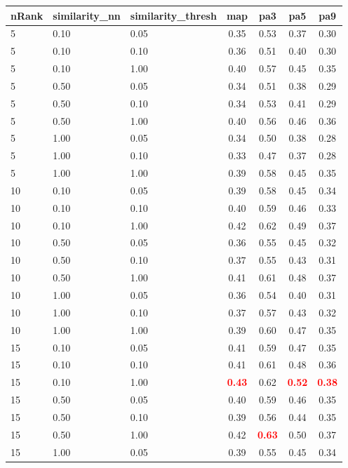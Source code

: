   
\begin{table} 
\begin{center} 
\scriptsize 
 \setlength{\tabcolsep}{.16667em} 
\begin{tabular}{lllcccc} 
nRank & similarity\_nn & similarity\_thresh & map & pa3 & pa5 & pa9 \\ 
\hline 
 5 & 0.10 & 0.05 & 0.35 & 0.53 & 0.37 & 0.30 \\ 
 5 & 0.10 & 0.10 & 0.36 & 0.51 & 0.40 & 0.30 \\ 
 5 & 0.10 & 1.00 & 0.40 & 0.57 & 0.45 & 0.35 \\ 
 5 & 0.50 & 0.05 & 0.34 & 0.51 & 0.38 & 0.29 \\ 
 5 & 0.50 & 0.10 & 0.34 & 0.53 & 0.41 & 0.29 \\ 
 5 & 0.50 & 1.00 & 0.40 & 0.56 & 0.46 & 0.36 \\ 
 5 & 1.00 & 0.05 & 0.34 & 0.50 & 0.38 & 0.28 \\ 
 5 & 1.00 & 0.10 & 0.33 & 0.47 & 0.37 & 0.28 \\ 
 5 & 1.00 & 1.00 & 0.39 & 0.58 & 0.45 & 0.35 \\ 
10 & 0.10 & 0.05 & 0.39 & 0.58 & 0.45 & 0.34 \\ 
10 & 0.10 & 0.10 & 0.40 & 0.59 & 0.46 & 0.33 \\ 
10 & 0.10 & 1.00 & 0.42 & 0.62 & 0.49 & 0.37 \\ 
10 & 0.50 & 0.05 & 0.36 & 0.55 & 0.45 & 0.32 \\ 
10 & 0.50 & 0.10 & 0.37 & 0.55 & 0.43 & 0.31 \\ 
10 & 0.50 & 1.00 & 0.41 & 0.61 & 0.48 & 0.37 \\ 
10 & 1.00 & 0.05 & 0.36 & 0.54 & 0.40 & 0.31 \\ 
10 & 1.00 & 0.10 & 0.37 & 0.57 & 0.43 & 0.32 \\ 
10 & 1.00 & 1.00 & 0.39 & 0.60 & 0.47 & 0.35 \\ 
15 & 0.10 & 0.05 & 0.41 & 0.59 & 0.47 & 0.35 \\ 
15 & 0.10 & 0.10 & 0.41 & 0.61 & 0.48 & 0.36 \\ 
15 & 0.10 & 1.00 & \textbf{\textcolor{red}{0.43}} & 0.62 & \textbf{\textcolor{red}{0.52}} & \textbf{\textcolor{red}{0.38}} \\ 
15 & 0.50 & 0.05 & 0.40 & 0.59 & 0.46 & 0.35 \\ 
15 & 0.50 & 0.10 & 0.39 & 0.56 & 0.44 & 0.35 \\ 
15 & 0.50 & 1.00 & 0.42 & \textbf{\textcolor{red}{0.63}} & 0.50 & 0.37 \\ 
15 & 1.00 & 0.05 & 0.39 & 0.55 & 0.45 & 0.34 \\ 

\end{tabular}
\end{center}
\end{table}
